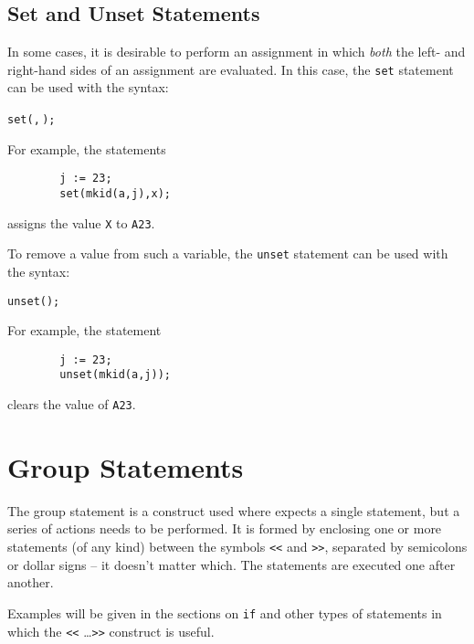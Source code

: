 \subsection{Set and Unset Statements}
\hypertarget{command:SET}{}
\hypertarget{command:UNSET}{}

In some cases, it is desirable to perform an assignment in which \emph{both}
the left- and right-hand sides of an assignment are
evaluated.  In this case, the \texttt{set} statement can
be used with the syntax:
\begin{syntax}
  \texttt{set(}\texttt{,}\,\texttt{);}
\end{syntax}
For example, the statements
\begin{verbatim}
        j := 23;
        set(mkid(a,j),x);
\end{verbatim}
assigns the value \texttt{X} to \texttt{A23}.

To remove a value from such a variable, the \texttt{unset}
statement can be used with the syntax:
\begin{syntax}
        \texttt{unset(}\texttt{);}
\end{syntax}
For example, the statement
\begin{verbatim}
        j := 23;
        unset(mkid(a,j));
\end{verbatim}
clears the value of \texttt{A23}.

\section{Group Statements}
\hypertarget{command:GROUP}{}

The group statement
 is a construct used where
{\REDUCE} expects a single statement, but a series of actions needs to be
performed.  It is formed by enclosing one or more statements (of any kind)
between the symbols \texttt{<}\texttt{<} and \texttt{>}\texttt{>},
separated by semicolons or
dollar signs -- it doesn't matter which.  The statements are executed one
after another.

Examples will be given in the sections on \texttt{if} and other
types of statements in which the \texttt{<}\texttt{<} \ldots \texttt{>}\texttt{>}
construct is useful.

